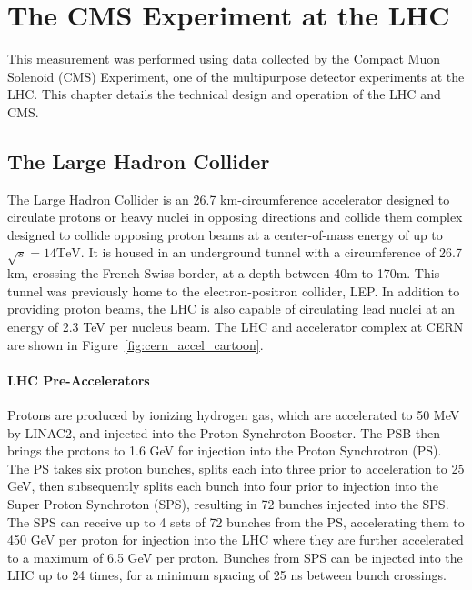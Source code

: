 \chapter{The CMS Experiment at the LHC}\label{ch:exp}
This measurement was performed using data collected by the Compact Muon Solenoid (CMS) Experiment, one of the multipurpose detector experiments at the LHC. This chapter details the technical design and operation of the LHC and CMS. 


\section{The Large Hadron Collider}
The Large Hadron Collider is an 26.7 km-circumference accelerator designed to circulate protons or heavy nuclei in opposing directions and collide them  complex designed to collide opposing proton beams at a center-of-mass energy of up to $\sqrt{s}=14\mathrm{TeV}$. It is housed in an underground tunnel with a circumference of 26.7 km, crossing the French-Swiss border, at a depth between 40m to 170m. This tunnel was previously home to the electron-positron collider, LEP. In addition to providing proton beams, the LHC is also capable of circulating lead nuclei at an energy of 2.3 TeV per nucleus beam. The LHC and accelerator complex at CERN are shown in Figure~\ref{fig:cern_accel_cartoon}.


\subsubsection{LHC Pre-Accelerators}
Protons are produced by ionizing hydrogen gas, which are accelerated to 50 MeV by LINAC2, and injected into the Proton Synchroton Booster. The PSB then brings the protons to 1.6 GeV for injection into the Proton Synchrotron (PS). The PS takes six proton bunches, splits each into three prior to acceleration to 25 GeV, then subsequently splits each bunch into four prior to injection into the Super Proton Synchroton (SPS), resulting in 72 bunches injected into the SPS. The SPS can receive up to 4 sets of 72 bunches from the PS, accelerating them to 450 GeV per proton for injection into the LHC where they are further accelerated to a maximum of 6.5 GeV per proton. Bunches from SPS can be injected into the LHC up to 24 times, for a minimum spacing of 25 ns between bunch crossings\cite{Benedikt:2004wm}. 

